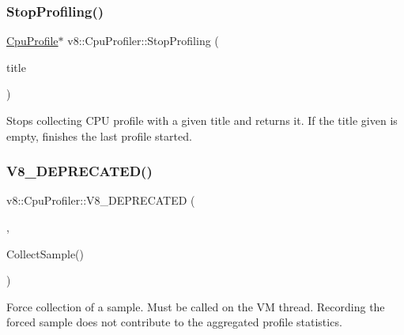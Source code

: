 \subsubsection{\texorpdfstring{Stop\+Profiling()}{StopProfiling()}}
{\footnotesize\ttfamily \mbox{\hyperlink{classv8_1_1CpuProfile}{Cpu\+Profile}}$\ast$ v8\+::\+Cpu\+Profiler\+::\+Stop\+Profiling (\begin{DoxyParamCaption}\item[{\mbox{\hyperlink{classv8_1_1Local}{Local}}$<$ \mbox{\hyperlink{classv8_1_1String}{String}} $>$}]{title }\end{DoxyParamCaption})}

Stops collecting C\+PU profile with a given title and returns it. If the title given is empty, finishes the last profile started. \mbox{\label{classv8_1_1CpuProfiler_a8ddea26e13e631875cb41dcb2563ff40}} 
\subsubsection{\texorpdfstring{V8\+\_\+\+D\+E\+P\+R\+E\+C\+A\+T\+E\+D()}{V8\_DEPRECATED()}\hspace{0.1cm}{\footnotesize\ttfamily [1/2]}}
{\footnotesize\ttfamily v8\+::\+Cpu\+Profiler\+::\+V8\+\_\+\+D\+E\+P\+R\+E\+C\+A\+T\+ED (\begin{DoxyParamCaption}\item[{\char`\"{}Use static \mbox{\hyperlink{classv8_1_1CpuProfiler_a88b787078f0c8742b3c077af0de4f46b}{Collect\+Sample}}(\mbox{\hyperlink{classv8_1_1Isolate}{Isolate}}$\ast$) instead.\char`\"{}}]{,  }\item[{void }]{Collect\+Sample() }\end{DoxyParamCaption})}

Force collection of a sample. Must be called on the VM thread. Recording the forced sample does not contribute to the aggregated profile statistics. \mbox{\label{classv8_1_1CpuProfiler_aa5a41d80d7d262f2c171a4382f2fbd4f}} 
